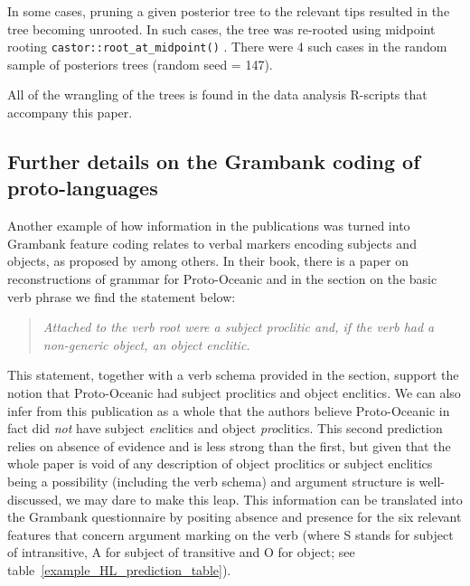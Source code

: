 \documentclass[12pt,letterpaper]{article}
\begin{document}
In some cases, pruning a given posterior tree to the relevant tips resulted in the tree becoming unrooted. In such cases, the tree was re-rooted using midpoint rooting \texttt{castor::root\_at\_midpoint()} \cite{R-castor}. There were 4 such cases in the random sample of posteriors trees (random seed = 147).

All of the wrangling of the trees is found in the data analysis R-scripts that accompany this paper.
\FloatBarrier    


\subsection{Further details on the Grambank coding of proto-languages }
\label{supp:proto_lg_coding}
Another example of how information in the publications was turned into Grambank feature coding relates to verbal markers encoding subjects and objects, as proposed by \citet{lynchrosscrowley_proto_grammar_oceanic} among others. In their book, there is a paper on reconstructions of grammar for Proto-Oceanic and in the section on the basic verb phrase we find the statement below:

\begin{quotation}
\noindent\emph{Attached to the verb root were a subject proclitic and, if the verb had a non-generic object, an object enclitic.} \end{quotation} \begin{flushright} \citet[83]{lynchrosscrowley_proto_grammar_oceanic} \end{flushright}

This statement, together with a verb schema provided in the section, support the notion that Proto-Oceanic had subject proclitics and object enclitics. We can also infer from this publication as a whole that the authors believe Proto-Oceanic in fact did \emph{not} have subject \emph{en}clitics and object \emph{pro}clitics. This second prediction relies on absence of evidence and is less strong than the first, but given that the whole paper is void of any description of object proclitics or subject enclitics being a possibility (including the verb schema) and argument structure is well-discussed, we may dare to make this leap. This information can be translated into the Grambank questionnaire by positing absence and presence for the six relevant features that concern argument marking on the verb (where S stands for subject of intransitive, A for subject of transitive and O for object; see table~\ref{example_HL_prediction_table}).
\end{document}

